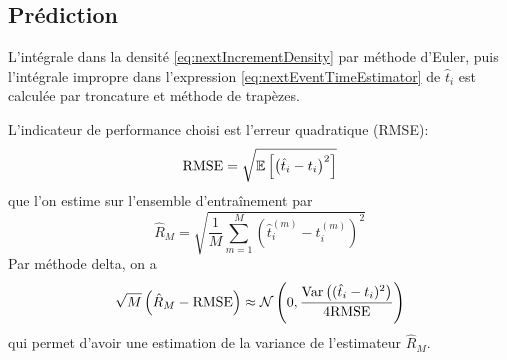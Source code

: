 \documentclass[../main.tex]{subfiles}
\begin{document}
\subsection{Prédiction}

L'intégrale dans la densité \eqref{eq:nextIncrementDensity} par méthode d'Euler, puis l'intégrale impropre dans l'expression \eqref{eq:nextEventTimeEstimator} de $\hat{t}_i$ est calculée par troncature et méthode de trapèzes.

L'indicateur de performance choisi est l'erreur quadratique (RMSE):
\begin{equation}\label{eq:rmse}
	\mathrm{RMSE} = \sqrt{\mathbb{E}\left[{\left(\hat{t}_i - t_i\right)}^2\right]}
\end{equation}
que l'on estime sur l'ensemble d'entraînement par
\[
	\hat{R}_M = \sqrt{\frac{1}{M}\sum_{m=1}^M
		\left(\hat{t}_i^{(m)} - t_i^{(m)}\right)^2
	}
\]
Par méthode delta, on a
\[
	\sqrt{M}\left(\hat{R}_M - \mathrm{RMSE}\right)
	\approx \mathcal{N}\left(0, \frac{
		\mathrm{Var}\left((\hat{t}_i - t_i)^2\right)}{4 \mathrm{RMSE}}
	\right)
\]
qui permet d'avoir une estimation de la variance de l'estimateur $\hat{R}_M$.
\end{document}
